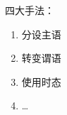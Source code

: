 \begin{notation}
四大手法：
\begin{enumerate}
    \item 分设主语
    \item 转变谓语
    \item 使用时态
    \item \ldots 
\end{enumerate}
\end{notation}
\newpage
{}

